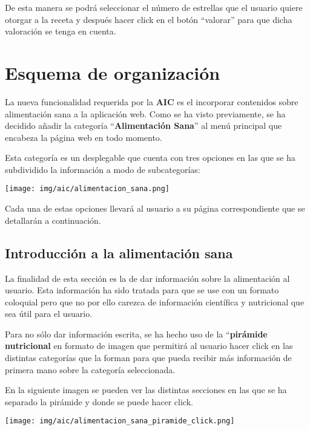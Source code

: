 \documentclass{\ClassPath/viu-tfm-template}
\begin{document}
De esta manera se podrá seleccionar el número de estrellas que el usuario quiere otorgar a la receta y después hacer click en el botón “valorar” para que dicha valoración se tenga en cuenta.


\chapter{Esquema de organización}

La nueva funcionalidad requerida por la \textbf{AIC} es el incorporar contenidos sobre alimentación sana a la aplicación web. Como se ha visto previamente, se ha decidido añadir la categoría “\textbf{Alimentación Sana}” al menú principal que encabeza la página web en todo momento.

Esta categoría es un desplegable que cuenta con tres opciones en las que se ha subdividido la información a modo de subcategorías:

\begin{center}
    \vspace{-10pt}
    \texttt{[image: img/aic/alimentacion\_sana.png]}
    \vspace{-20pt}
\end{center}


Cada una de estas opciones llevará al usuario a su página correspondiente que se detallarán a continuación.


\section{Introducción a la alimentación sana}
La finalidad de esta sección es la de dar información sobre la alimentación al usuario. Esta información ha sido tratada para que se use con un formato coloquial pero que no por ello carezca de información científica y nutricional que sea útil para el usuario.

Para no sólo dar información escrita, se ha hecho uso de la “\textbf{pirámide nutricional} en formato de imagen que permitirá al usuario hacer click en las distintas categorías que la forman para que pueda recibir más información de primera mano sobre la categoría seleccionada.

En la siguiente imagen se pueden ver las distintas secciones en las que se ha separado la pirámide y donde se puede hacer click.
\begin{center}
    \vspace{-10pt}
    \texttt{[image: img/aic/alimentacion\_sana\_piramide\_click.png]}
    \vspace{-20pt}
\end{center}
\end{document}
